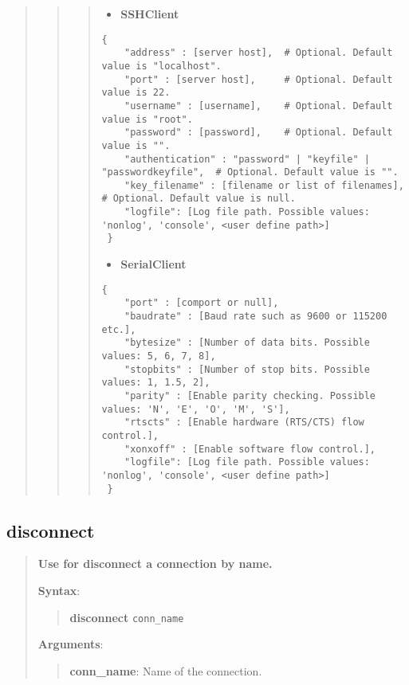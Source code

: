 \begin{quote}
\begin{quote}
\begin{quote}
\begin{itemize}
\tightlist
\item
  \textbf{SSHClient}
\end{itemize}

\begin{verbatim}
{
    "address" : [server host],  # Optional. Default value is "localhost".
    "port" : [server host],     # Optional. Default value is 22.
    "username" : [username],    # Optional. Default value is "root".
    "password" : [password],    # Optional. Default value is "".
    "authentication" : "password" | "keyfile" | "passwordkeyfile",  # Optional. Default value is "".
    "key_filename" : [filename or list of filenames], # Optional. Default value is null.
    "logfile": [Log file path. Possible values: 'nonlog', 'console', <user define path>]
 }
\end{verbatim}

\begin{itemize}
\tightlist
\item
  \textbf{SerialClient}
\end{itemize}

\begin{verbatim}
{
    "port" : [comport or null],
    "baudrate" : [Baud rate such as 9600 or 115200 etc.],
    "bytesize" : [Number of data bits. Possible values: 5, 6, 7, 8],
    "stopbits" : [Number of stop bits. Possible values: 1, 1.5, 2],
    "parity" : [Enable parity checking. Possible values: 'N', 'E', 'O', 'M', 'S'],
    "rtscts" : [Enable hardware (RTS/CTS) flow control.],
    "xonxoff" : [Enable software flow control.],
    "logfile": [Log file path. Possible values: 'nonlog', 'console', <user define path>]
 }
\end{verbatim}
\end{quote}
\end{quote}
\end{quote}

\hypertarget{description-disconnect}{%
\subsection{\texorpdfstring{\textbf{disconnect}}{disconnect}}\label{description-disconnect}}

\begin{quote}
\textbf{Use for disconnect a connection by name.}

\textbf{Syntax}:

\begin{quote}
\textbf{disconnect} \texttt{conn\_name}
\end{quote}

\textbf{Arguments}:

\begin{quote}
\textbf{conn\_name}: Name of the connection.
\end{quote}
\end{quote}

